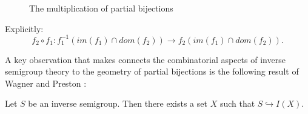 \begin{figure}[h]
\begin{center}

\def\firstcircle{(-0.25,-1.25) circle (1.0cm)}
\def\secondcircle{(-0.25,0) circle (1.0cm)}
\def\thirdcircle{(-4.75,0) circle (1.0cm)}
\def\forthcircle{(-4.75,-2.5) circle (1.0cm)}
\def\fifthcircle{(-4.75,-1.25) circle (1.0cm)}

    
\setlength{\parskip}{5mm}

\caption{The multiplication of partial bijections}
\label{Fig:Comp}
\end{center}
\end{figure}
Explicitly:
\begin{equation*}
f_{2}\circ f_{1}: f_{1}^{-1}(im(f_{1})\cap dom(f_{2})) \rightarrow f_{2}(im(f_{1})\cap dom(f_{2})).
\end{equation*}

A key observation that makes connects the combinatorial aspects of inverse semigroup theory to the geometry of partial bijections is the following result of Wagner and Preston \cite{MR1455373}:

\begin{theorem}\label{Thm:WP}
Let $S$ be an inverse semigroup. Then there exists a set $X$ such that $S \hookrightarrow I(X)$.
\end{theorem}

